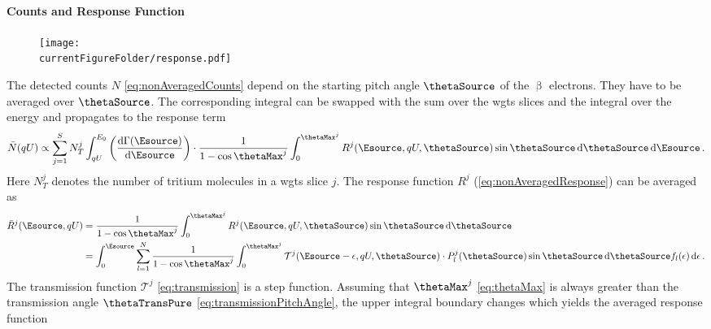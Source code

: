 \paragraph{Counts and Response Function}
\begin{figure}
    \centering
    \texttt{[image: \\currentFigureFolder/response.pdf]}
    \label{fig:response}
\end{figure}
The detected counts $N$ \eqref{eq:nonAveragedCounts} depend on the starting pitch angle $\thetaSource$ of the $\upbeta$ electrons. They have to be averaged over $\thetaSource$. The corresponding integral can be swapped with the sum over the \gls{wgts} slices and the integral over the energy and propagates to the response term
\begin{align}
\label{eq:SSCcounts}
\bar{N}(qU) \propto \sum_{j=1}^S N_T^j
\int_{qU}^{E_0}
    \left(\frac{\d \Gamma(\Esource)}{ \d \Esource}\right) \cdot
    \frac{1}{1-\cos\thetaMax^j}
    \int_{0}^{\thetaMax^j}
        R^j(\Esource, qU, \thetaSource) 
        \sin\thetaSource \d \thetaSource
\d \Esource
\fullstop
\end{align}
Here $N_T^j$ denotes the number of tritium molecules in a \gls{wgts} slice $j$. The response function $R^j$ (\ref{eq:nonAveragedResponse}) can be averaged as
\begin{equation}
\begin{split}
    \bar{R}^j(\Esource,qU) &= 
    \frac{1}{1-\cos\thetaMax^j}
    \int_{0}^{\thetaMax^j}
        R^j(\Esource, qU, \thetaSource) 
    \sin\thetaSource \d \thetaSource \\ &=
    \int_0^{\Esource}
        \sum_{l=1}^{N}
            \frac{1}{1-\cos\thetaMax^j}
            \int_{0}^{\thetaMax^j}
            \mathcal{T}^j(\Esource-\epsilon, qU, \thetaSource) \cdot
            P^j_l(\thetaSource)
            \sin\thetaSource \d \thetaSource
            f_l(\epsilon)
    \d \epsilon
    \fullstop
\end{split}
\end{equation}
The transmission function $\mathcal{T}^j$ \eqref{eq:transmission} is a step function. Assuming that $\thetaMax^j$ \eqref{eq:thetaMax} is always greater than the transmission angle $\thetaTransPure$ \eqref{eq:transmissionPitchAngle}, the upper integral boundary changes which yields the averaged response function
